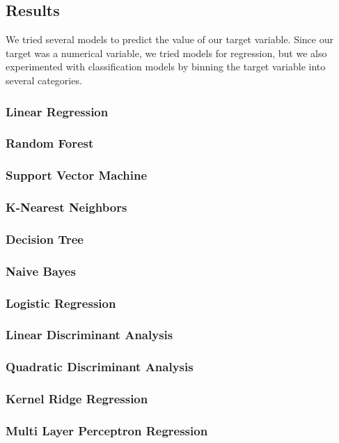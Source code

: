 \pagebreak
\subsection{Results}%
\label{sub:results}

We tried several models to predict the value of our target variable. Since our target
was a numerical variable, we tried models for regression, but we also experimented with
classification models by binning the target variable into several categories.

\subsubsection{Linear Regression}%
\label{ssub:linear-regression}

\subsubsection{Random Forest}%
\label{ssub:random-forest}

\subsubsection{Support Vector Machine}%
\label{ssub:support-vector-machine}

\subsubsection{K-Nearest Neighbors}%
\label{ssub:k-nearest-neighbors}

\subsubsection{Decision Tree}%
\label{ssub:decision-tree}

\subsubsection{Naive Bayes}%
\label{ssub:naive-bayes}

\subsubsection{Logistic Regression}%
\label{ssub:logistic-regression}

\subsubsection{Linear Discriminant Analysis}%
\label{ssub:linear-discriminant-analysis}

\subsubsection{Quadratic Discriminant Analysis}%
\label{ssub:quadratic-discriminant-analysis}

\subsubsection{Kernel Ridge Regression}%
\label{ssub:kernel-ridge-regression}

\subsubsection{Multi Layer Perceptron Regression}%
\label{ssub:multi-layer-perceptron-regression}
